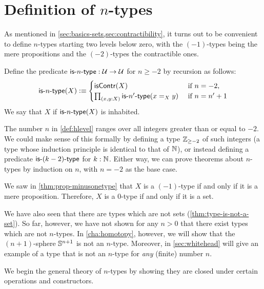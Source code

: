 \section{Definition of \texorpdfstring{$n$}{n}-types}
\label{sec:n-types}

As mentioned in \autoref{sec:basics-sets,sec:contractibility}, it turns out to be convenient to define $n$-types starting two levels below zero, with the $(-1)$-types being the mere propositions and the $(-2)$-types the contractible ones.

\begin{defn}\label{def:hlevel}
  Define the predicate $\mathsf{is}\mbox{-}{n}\mbox{-}\mathsf{type} : \mathcal{U} \to \mathcal{U}$ for $n \geq -2$ by recursion as follows:
  \[ \istype{n}(X) \defeq
  \begin{cases}
    \iscontr(X) & \text{ if } n = -2 , \\
    \prd{x,y : X} \istype{n'}(\id[X]{x}{y}) & \text{ if } n = n'+1
  \end{cases}
  \]
  We say that $X$  if $\mathsf{is}\mbox{-}{n}\mbox{-}\mathsf{type}(X)$ is inhabited.
\end{defn}

\begin{rmk}
  The number $n$ in \autoref{def:hlevel} ranges over all integers greater than or equal to $-2$.
  We could make sense of this formally by defining a type $\mathbb{Z}_{{\geq}-2}$ of such integers (a type whose induction principle is identical to that of $\mathbb{N}$), or instead defining a predicate $\mathsf{is}\mbox{-}{(k-2)}\mbox{-}\mathsf{type}$ for $k : \mathbb{N}$.
  Either way, we can prove theorems about $n$-types by induction on $n$, with $n = -2$ as the base case.
\end{rmk}

\begin{eg}
  We saw in \autoref{thm:prop-minusonetype} that $X$ is a $(-1)$-type if and only if it is a mere proposition.
  Therefore, $X$ is a $0$-type if and only if it is a set.
\end{eg}

We have also seen that there are types which are not sets (\autoref{thm:type-is-not-a-set}).
So far, however, we have not shown for any $n>0$ that there exist types which are not $n$-types.
In \autoref{cha:homotopy}, however, we will show that the $(n+1)$-sphere $\mathbb{S}^{n+1}$ is not an $n$-type.
Moreover, in \autoref{sec:whitehead} will give an example of a type that is not an $n$-type for \emph{any} (finite) number $n$.

We begin the general theory of $n$-types by showing they are closed under certain operations and constructors.

